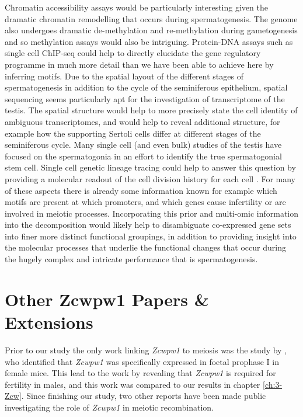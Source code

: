 Chromatin accessibility assays would be particularly interesting given the dramatic chromatin remodelling that occurs during spermatogenesis. The genome also undergoes dramatic de-methylation and re-methylation during gametogenesis and so methylation assays would also be intriguing. Protein-DNA assays such as single cell ChIP-seq could help to directly elucidate the gene regulatory programme in much more detail than we have been able to achieve here by inferring motifs. Due to the spatial layout of the different stages of spermatogenesis in addition to the cycle of the seminiferous epithelium, spatial sequencing seems particularly apt for the investigation of transcriptome of the testis. The spatial structure would help to more precisely state the cell identity of ambiguous transcriptomes, and would help to reveal additional structure, for example how the supporting Sertoli cells differ at different stages of the seminiferous cycle. Many single cell (and even bulk) studies of the testis have focused on the spermatogonia in an effort to identify the true spermatogonial stem cell. Single cell genetic lineage tracing could help to answer this question by providing a molecular readout of the cell division history for each cell \parencite[reviewed in][]{Baron2019Unravelling, McKenna2019Recording}. For many of these aspects there is already some information known for example which motifs are present at which promoters, and which genes cause infertility or are involved in meiotic processes. Incorporating this prior and multi-omic information into the decomposition would likely help to disambiguate co-expressed gene sets into finer more distinct functional groupings, in addition to providing insight into the molecular processes that underlie the functional changes that occur during the hugely complex and intricate performance that is spermatogenesis.

\section{Other Zcwpw1 Papers \& Extensions}

Prior to our study the only work linking \textit{Zcwpw1} to meiosis was the study by \cite{Soh2015Gene}, who identified that \textit{Zcwpw1} was specifically expressed in foetal prophase I in female mice. This lead to the work by \cite{Li2019histone} revealing that \textit{Zcwpw1} is required for fertility in males, and this work was compared to our results in chapter \ref{ch:3-Zcw}. Since finishing our study, two other reports have been made public investigating the role of \textit{Zcwpw1} in meiotic recombination.

